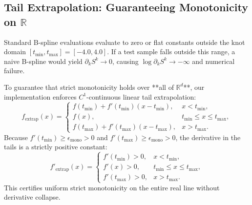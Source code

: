 \documentclass[11pt,a4paper]{article}
\theoremstyle{plain}
\theoremstyle{definition}
\theoremstyle{remark}
\begin{document}
\subsection{Tail Extrapolation: Guaranteeing Monotonicity on \texorpdfstring{$\mathbb{R}$}{R}}

Standard B-spline evaluations evaluate to zero or flat constants outside the knot domain $[t_{\min}, t_{\max}] = [-4.0, 4.0]$. If a test sample falls outside this range, a naive B-spline would yield $\partial_k S^k \to 0$, causing $\log \partial_k S^k \to -\infty$ and numerical failure.

To guarantee that strict monotonicity holds over **all of $\mathbb{R}^d$**, our implementation enforces $C^1$-continuous linear tail extrapolation:
\begin{equation}
    f_{\text{extrap}}(x) = \begin{cases}
        f(t_{\min}) + f'(t_{\min})(x - t_{\min}), & x < t_{\min}, \\
        f(x), & t_{\min} \le x \le t_{\max}, \\
        f(t_{\max}) + f'(t_{\max})(x - t_{\max}), & x > t_{\max}.
    \end{cases}
\end{equation}
Because $f'(t_{\min}) \ge \epsilon_{\text{mono}} > 0$ and $f'(t_{\max}) \ge \epsilon_{\text{mono}} > 0$, the derivative in the tails is a strictly positive constant:
\begin{equation}
    f'_{\text{extrap}}(x) = \begin{cases}
        f'(t_{\min}) > 0, & x < t_{\min}, \\
        f'(x) > 0, & t_{\min} \le x \le t_{\max}, \\
        f'(t_{\max}) > 0, & x > t_{\max}.
    \end{cases}
\end{equation}
This certifies uniform strict monotonicity on the entire real line without derivative collapse.
\end{document}
